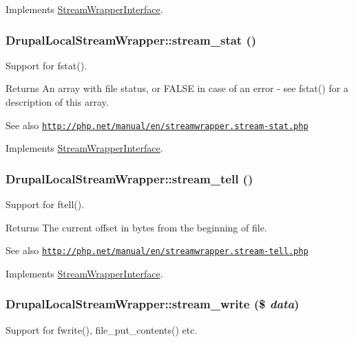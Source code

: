 Implements \hyperlink{interfaceStreamWrapperInterface}{StreamWrapperInterface}.\hypertarget{classDrupalLocalStreamWrapper_ab9f190ff1874ea68611fd6f4c160b8ae}{
\subsubsection[{stream\_\-stat}]{\setlength{\rightskip}{0pt plus 5cm}DrupalLocalStreamWrapper::stream\_\-stat ()}}
\label{classDrupalLocalStreamWrapper_ab9f190ff1874ea68611fd6f4c160b8ae}
Support for fstat().

\begin{DoxyReturn}{Returns}
An array with file status, or FALSE in case of an error -\/ see fstat() for a description of this array.
\end{DoxyReturn}
\begin{DoxySeeAlso}{See also}
\href{http://php.net/manual/en/streamwrapper.stream-stat.php}{\tt http://php.net/manual/en/streamwrapper.stream-\/stat.php} 
\end{DoxySeeAlso}


Implements \hyperlink{interfaceStreamWrapperInterface}{StreamWrapperInterface}.\hypertarget{classDrupalLocalStreamWrapper_a2d9711b5c3f38c821fe59d14b7e9e2fe}{
\subsubsection[{stream\_\-tell}]{\setlength{\rightskip}{0pt plus 5cm}DrupalLocalStreamWrapper::stream\_\-tell ()}}
\label{classDrupalLocalStreamWrapper_a2d9711b5c3f38c821fe59d14b7e9e2fe}
Support for ftell().

\begin{DoxyReturn}{Returns}
The current offset in bytes from the beginning of file.
\end{DoxyReturn}
\begin{DoxySeeAlso}{See also}
\href{http://php.net/manual/en/streamwrapper.stream-tell.php}{\tt http://php.net/manual/en/streamwrapper.stream-\/tell.php} 
\end{DoxySeeAlso}


Implements \hyperlink{interfaceStreamWrapperInterface}{StreamWrapperInterface}.\hypertarget{classDrupalLocalStreamWrapper_af10477b614bdec57f999056f879895d2}{
\subsubsection[{stream\_\-write}]{\setlength{\rightskip}{0pt plus 5cm}DrupalLocalStreamWrapper::stream\_\-write (\$ {\em data})}}
\label{classDrupalLocalStreamWrapper_af10477b614bdec57f999056f879895d2}
Support for fwrite(), file\_\-put\_\-contents() etc.


